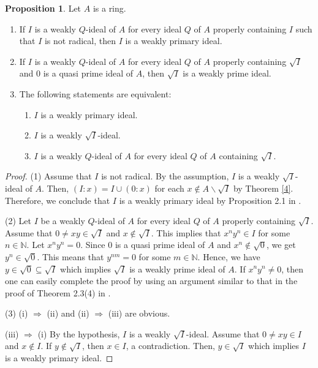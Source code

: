 \documentclass[preprint,review,10pt]{amsart}
\theoremstyle{definition}
\newtheorem{proposition}[theorem]{Proposition}
\theoremstyle{remark}
\numberwithin{equation}{section}
\begin{document}
\begin{proposition}
Let $A$ is a ring. 
\begin{enumerate}
\item If $I$ is a weakly $Q$-ideal   of $A$ for every ideal $Q$ of $A$ properly containing $I$  such that $I$ is not radical, then $I$ is a weakly primary ideal.
\item  If $I$ is a weakly $Q$-ideal of $A$ for every ideal $Q$ of $A$ properly containing $\sqrt{I}$ and $ 0$ is a quasi prime ideal of $A$, then $\sqrt{I}$ is a weakly prime ideal.
\item The following statements are equivalent:
\begin{enumerate}
\item[(i)] $I$ is a weakly primary ideal.
\item[(ii)] $I$ is a weakly $\sqrt{I}$-ideal.
\item[(iii)] $I$ is a weakly $Q$-ideal of $A$ for every ideal $Q$ of $A$ containing $\sqrt{I}$.
\end{enumerate}
\end{enumerate}
\begin{proof}
(1) Assume that  $I$ is not radical. By the assumption, $I$ is a weakly $\sqrt{I}$-ideal of $A$. Then, $(I:x)=I \cup (0:x)$ for each $x \notin A \backslash \sqrt{I}$ by Theorem \ref{4}. Therefore, we conclude that $I$ is   a weakly primary ideal by Proposition 2.1 in \cite{Atani}.

(2) Let $I$ be  a weakly $Q$-ideal of $A$ for every ideal $Q$ of $A$ properly containing $\sqrt{I}$. Assume that $0 \neq xy \in \sqrt{I}$ and $x \notin \sqrt{I}$. This implies that $x^ny^n \in I$ for some $n \in \mathbb{N}$. Let $x^ny^n=0$. Since $0$ is a quasi prime ideal of $A$ and $x^n \notin \sqrt{0}$, we get $y^n \in \sqrt{0}$. This means that $y^{nm}=0$ for some $m \in \mathbb{N}$. Hence, we have $y \in \sqrt{0} \subseteq \sqrt{I}$ which implies  $\sqrt{I}$ is a weakly prime ideal of $A$. If   $x^ny^n \neq 0$, then one can easily complete the proof  by using an argument similar to that in the proof of Theorem 2.3(4)  in \cite{Mimouni}.

(3) (i) $\Longrightarrow$ (ii) and (ii) $\Longrightarrow$ (iii) are obvious.

(iii) $\Longrightarrow$ (i) By the hypothesis, $I$ is a weakly $\sqrt{I}$-ideal. Assume that  $0 \neq xy \in I$ and $x \notin I$. If $y \notin \sqrt{I}$, then $x \in I$, a contradiction. Then,   $y \in \sqrt{I}$  which implies  $I$ is a weakly primary ideal.
\end{proof}
\end{proposition}
\end{document}
